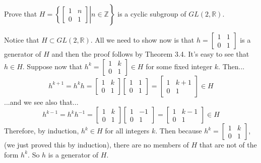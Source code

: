 \documentclass{article}
\begin{document}
Prove that $H=\left.\left\{\left[\begin{array}{cc}1&n\\0&1\end{array}\right]\right|n\in\mathbb{Z}\right\}$
is a cyclic subgroup of $GL(2,\mathbb{R})$.

Notice that $H\subset GL(2,\mathbb{R})$.
All we need to show now is that $h=\left[\begin{array}{cc}1&1\\0&1\end{array}\right]$ is
a generator of $H$ and then the proof follows by Theorem 3.4.  It's easy to see
that $h\in H$.  Suppose now that $h^k=\left[\begin{array}{cc}1&k\\0&1\end{array}\right]\in H$
for some fixed integer $k$.  Then...
\begin{equation*}
h^{k+1}=h^kh=
\left[\begin{array}{cc}1&k\\0&1\end{array}\right]
\left[\begin{array}{cc}1&1\\0&1\end{array}\right]=
\left[\begin{array}{cc}1&k+1\\0&1\end{array}\right]\in H
\end{equation*}
...and we see also that...
\begin{equation*}
h^{k-1}=h^kh^{-1}=
\left[\begin{array}{cc}1&k\\0&1\end{array}\right]
\left[\begin{array}{cc}1&-1\\0&1\end{array}\right]=
\left[\begin{array}{cc}1&k-1\\0&1\end{array}\right]\in H
\end{equation*}
Therefore, by induction, $h^k\in H$ for all integers $k$.  Then because
$h^k=\left[\begin{array}{cc}1&k\\0&1\end{array}\right]$, (we just proved
this by induction), there are no members of $H$ that are not of the form $h^k$.
So $h$ is a generator of $H$.
\end{document}
